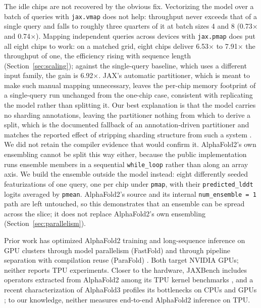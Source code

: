 The idle chips are not recovered by the obvious fix. Vectorizing the
model over a batch of queries with \texttt{jax.vmap} does not help:
throughput never exceeds that of a single query and falls to roughly
three quarters of it at batch sizes 4 and 8 (0.73$\times$ and
0.74$\times$). Mapping independent queries
across devices with \texttt{jax.pmap} does put all eight chips to work:
on a matched grid, eight chips deliver 6.53$\times$ to 7.91$\times$ the
throughput of one, the efficiency rising with sequence length
(Section~\ref{sec:scaling}); against the single-query baseline, which
uses a different input family, the gain is 6.92$\times$.
JAX's automatic partitioner, which is meant to make such manual
mapping unnecessary, leaves the per-chip memory footprint of a
single-query run unchanged from the one-chip case, consistent with
replicating the model rather than splitting it. Our best explanation
is that the model carries no sharding annotations, leaving the
partitioner nothing from which to derive a split, which is the
documented fallback of an annotation-driven partitioner
\citep{xu2021gspmd,shardy2026} and matches the reported effect of
stripping sharding structure from such a system \citep{drjax2024}.
We did not retain the compiler evidence that would confirm it. AlphaFold2's own
ensembling cannot be split this way either, because the public
implementation runs ensemble members in a sequential \texttt{while\_loop}
rather than along an array axis. We build the ensemble outside the
model instead: eight differently seeded featurizations of
one query, one per chip under \texttt{pmap}, with their
\texttt{predicted\_lddt} logits averaged by \texttt{pmean}. AlphaFold2's
source and its internal \texttt{num\_ensemble\,=\,1} path are left
untouched, so this demonstrates that an ensemble can be spread across
the slice; it does not replace AlphaFold2's own ensembling
(Section~\ref{sec:parallelism}).

Prior work has optimized AlphaFold2 training and long-sequence
inference on GPU clusters through model parallelism (FastFold) and through pipeline separation with
compilation reuse (ParaFold) \citep{cheng2024fastfold,zhong2022parafold}.
Both target NVIDIA GPUs; neither reports TPU experiments.
Closer to the hardware, JAXBench includes operators extracted from
AlphaFold2 among its TPU kernel benchmarks \citep{jaxbench2026}, and a recent characterization of
AlphaFold3 profiles its bottlenecks on CPUs and GPUs
\citep{iiswc2025af3}; to our knowledge, neither measures end-to-end
AlphaFold2 inference on TPU.


